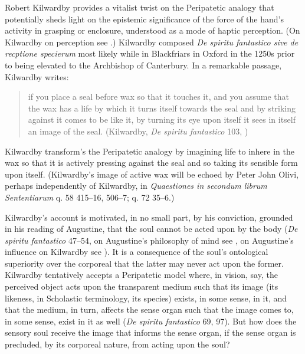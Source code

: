 Robert Kilwardby provides a vitalist twist on the Peripatetic analogy that potentially sheds light on the epistemic significance of the force of the hand's activity in grasping or enclosure, understood as a mode of haptic perception. (On Kilwardby on perception see \citealt{Silva:2008yg,Silva:2010zh,Silva:2012tg}.) Kilwardby composed \emph{De spiritu fantastico sive de recptione specierum} most likely while in Blackfriars in Oxford in the 1250s prior to being elevated to the Archbishop of Canterbury. In a remarkable passage, Kilwardby writes:
\begin{quote}
	if you place a seal before wax so that it touches it, and you assume that the wax has a life by which it turns itself towards the seal and by striking against it comes to be like it, by turning its eye upon itself it sees in itself an image of the seal. (Kilwardby, \emph{De spiritu fantastico} 103, \citealt[94]{Broadie:1993dz})
\end{quote}
Kilwardby transform's the Peripatetic analogy by imagining life to inhere in the wax so that it is actively pressing against the seal and so taking its sensible form upon itself. (Kilwardby's image of active wax will be echoed by Peter John Olivi, perhaps independently of Kilwardby, in \emph{Quaestiones in secondum librum Sententiarum} q. 58 415--16, 506--7; q. 72 35--6.) 

Kilwardby's account is motivated, in no small part, by his conviction, grounded in his reading of Augustine, that the soul cannot be acted upon by the body (\emph{De spiritu fantastico} 47--54, on Augustine's philosophy of mind see \citealt{ODaly:1987fq}, on Augustine's influence on Kilwardby see \citealt{Silva:2010zh}). It is a consequence of the soul's ontological superiority over the corporeal that the latter may never act upon the former. Kilwardby tentatively accepts a Peripatetic model where, in vision, say, the perceived object acts upon the transparent medium such that its image (its likeness, in Scholastic terminology, its species) exists, in some sense, in it, and that the medium, in turn, affects the sense organ such that the image comes to, in some sense, exist in it as well (\emph{De spiritu fantastico} 69, 97). But how does the sensory soul receive the image that informs the sense organ, if the sense organ is precluded, by its corporeal nature, from acting upon the soul? 


